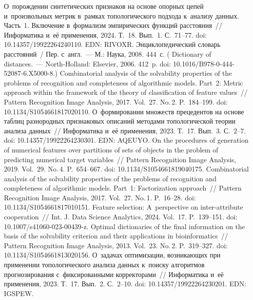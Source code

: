 \begin{multicols}{2}
{\small\frenchspacing
 {\baselineskip=10.6pt
 \begin{thebibliography}{99}
  
 О~порождении синтетических признаков на основе опорных цепей 
и~произвольных метрик в~рамках топологического подхода к~анализу данных. Часть~1. 
Включение в~формализм эмпирических функций расстояния~// Информатика и~её 
применения, 2024. Т.~18. Вып.~1. С.~71--77. doi: 10.14357/19922264240110. EDN: 
RIVOXR.
   Энциклопедический словарь расстояний~/ Пер. с~англ.~--- М.: Наука, 
2008. 444~с. ( {Dictionary of distances}.~--- North-Holland: 
Elsevier, 2006. 412~p. doi: 10.1016/B978-0-444-52087-6.X5000-8.)
   Combinatorial analysis of the solvability properties of 
the problems of recognition and completeness of algorithmic models. Part~2: Metric approach 
within the framework of the theory of classification of feature values~// Pattern Recognition Image 
Analysis, 2017. Vol.~27. No.\,2. P.~184--199. doi: 10.1134/S1054661817020110.
 О~формировании множеств прецедентов на основе таблиц 
разнородных признаковых описаний методами топологической теории анализа данных~// 
Информатика и~её применения, 2023. Т.~17. Вып.~3. С.~2--7. doi: 
10.14357/19922264230301. EDN: AQEUYO.
   On the procedures of generation of numerical features 
over partitions of sets of objects in the problem of predicting numerical target variables~// 
Pattern Recognition Image Analysis, 2019. Vol.~29. No.\,4. P.~654--667. doi: 
10.1134/S1054661819040175. 
   Combinatorial analysis of the solvability properties of 
the problems of recognition and completeness of algorithmic models. Part~1: Factorization 
approach~// Pattern Recognition Image Analysis, 2017. Vol.~27. No.\,1. P.~16--28. doi: 
10.1134/S1054661817010151.
   Feature selection: A~perspective on inter-attribute 
cooperation~// Int. J. Data Science Analytics, 2024. Vol.~17. P.~139--151. doi:  
10.1007/s41060-023-00439-z.
   Optimal dictionaries of the final information on the basis of the solvability 
criterion and their applications in bioinformatics~// Pattern Recognition Image Analysis, 2013. 
Vol.~23. No.\,2. P.~319--327. doi: 10.1134/S1054661813020156.
 О~задачах оптимизации, воз\-ни\-ка\-ющих при применении 
топологического анализа данных к~поиску алгоритмов прогнозирования 
с~фиксированными корректорами~// Информатика и~её применения, 2023. Т.~17. Вып.~2. 
С.~2--10. doi: 10.14357/19922264230201. EDN: IGSPEW.

\end{thebibliography}

 }
 }

\end{multicols}

